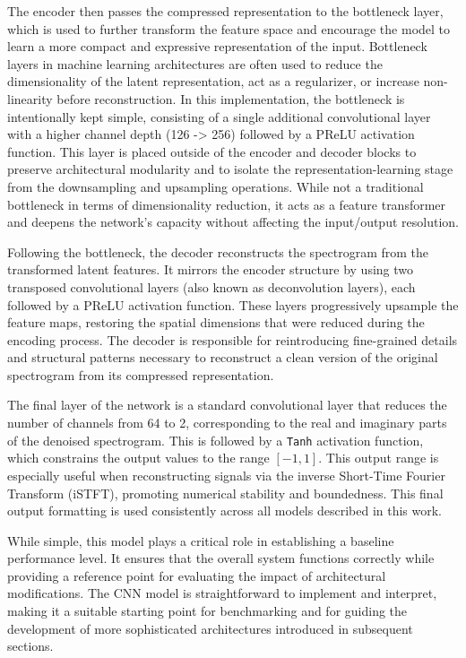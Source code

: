 The encoder then passes the compressed representation to the bottleneck layer, which is used to further transform the feature space and encourage the model to learn a more compact and expressive representation of the input. Bottleneck layers in machine learning architectures are often used to reduce the dimensionality of the latent representation, act as a regularizer, or increase non-linearity before reconstruction. In this implementation, the bottleneck is intentionally kept simple, consisting of a single additional convolutional layer with a higher channel depth (126 -> 256) followed by a PReLU activation function. This layer is placed outside of the encoder and decoder blocks to preserve architectural modularity and to isolate the representation-learning stage from the downsampling and upsampling operations. While not a traditional bottleneck in terms of dimensionality reduction, it acts as a feature transformer and deepens the network's capacity without affecting the input/output resolution.

Following the bottleneck, the decoder reconstructs the spectrogram from the transformed latent features. It mirrors the encoder structure by using two transposed convolutional layers (also known as deconvolution layers), each followed by a PReLU activation function. These layers progressively upsample the feature maps, restoring the spatial dimensions that were reduced during the encoding process. The decoder is responsible for reintroducing fine-grained details and structural patterns necessary to reconstruct a clean version of the original spectrogram from its compressed representation.

The final layer of the network is a standard convolutional layer that reduces the number of channels from 64 to 2, corresponding to the real and imaginary parts of the denoised spectrogram. This is followed by a \texttt{Tanh} activation function, which constrains the output values to the range \([-1, 1]\). This output range is especially useful when reconstructing signals via the inverse Short-Time Fourier Transform (iSTFT), promoting numerical stability and boundedness. This final output formatting is used consistently across all models described in this work.


While simple, this model plays a critical role in establishing a baseline performance level. It ensures that the overall system functions correctly while providing a reference point for evaluating the impact of architectural modifications. The CNN model is straightforward to implement and interpret, making it a suitable starting point for benchmarking and for guiding the development of more sophisticated architectures introduced in subsequent sections.

